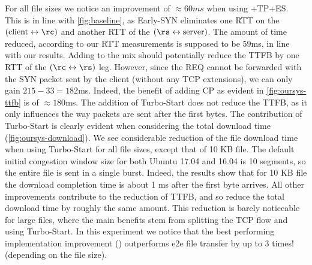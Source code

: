 For all file sizes we notice an improvement of $\approx60ms$ when using \oursys+TP+ES. This is in line with \autoref{fig:baseline}, as Early-SYN eliminates one RTT on the $(\mbox{client}\leftrightarrow\rc)$ and another RTT of the $(\rs\leftrightarrow\mbox{server})$. The amount of time reduced, according to our RTT measurements is supposed to be $59$ms, in line with our results. Adding \reconn to the mix should potentially reduce the TTFB by one RTT of the $(\rc\leftrightarrow\rs)$ leg. However, since the REQ cannot be forwarded with the SYN packet sent by the client (without any TCP extensions), we can only gain $215-33=182$ms. Indeed, the benefit of adding CP as evident in \autoref{fig:oursys-ttfb} is of $\approx 180$ms. The addition of Turbo-Start does not reduce the TTFB, as it only influences the way packets are sent after the first bytes. The contribution of Turbo-Start is clearly evident when considering the total download time (\autoref{fig:oursys-download}). We see considerable reduction of the file download time when using Turbo-Start for all file sizes, except that of 10 KB file. The default initial congestion window size for both Ubuntu 17.04 and 16.04 is 10 segments, so the entire file is sent in a single burst. Indeed, the results show that for 10 KB file the download completion time is about 1 ms after the first byte arrives. All other improvements contribute to the reduction of TTFB, and so reduce the total download time by roughly the same amount. This reduction is barely noticeable for large files, where the main benefits stem from splitting the TCP flow and using Turbo-Start.
In this experiment we notice that the best performing implementation improvement (\ie \oursys) outperforms e2e file transfer by up to 3 times! (depending on the file size).


